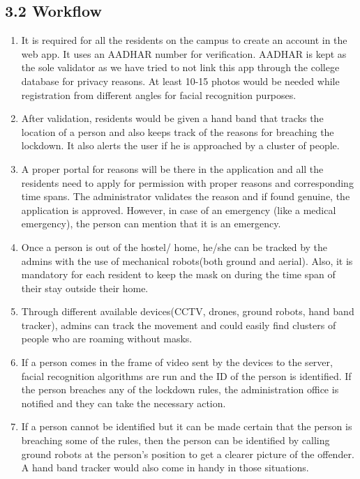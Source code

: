 \documentclass[eng]{FCEFyN-class}
\begin{document}
\subsection{3.2 Workflow}
\begin{enumerate}
\item  It is required for all the residents on the campus to create an account in the web app. It uses an AADHAR number for verification. AADHAR is kept as the sole validator as we have tried to not link this app through the college database for privacy reasons. At least 10-15 photos would be needed while registration from different angles for facial recognition purposes. 

\item After validation, residents would be given a hand band that tracks the location of a person and also keeps track of the reasons for breaching the lockdown. It also alerts the user if he is approached by a cluster of people.

\item A proper portal for reasons will be there in the application and all the residents need to apply for permission with proper reasons and corresponding time spans. The administrator validates the reason and if found genuine, the application is approved. However, in case of an emergency (like a medical emergency), the person can mention that it is an emergency.
\item Once a person is out of the hostel/ home, he/she can be tracked by the admins with the use of mechanical robots(both ground and aerial). Also, it is mandatory for each resident to keep the mask on during the time span of their stay outside their home.
\item Through different available devices(CCTV, drones, ground robots, hand band tracker), admins can track the movement and could easily find clusters of people who are roaming without masks.

\item If a person comes in the frame of video sent by the devices to the server, facial recognition algorithms are run and the ID of the person is identified. If the person breaches any of the lockdown rules, the administration office is notified and they can take the necessary action.

\item If a person cannot be identified but it can be made certain that the person is breaching some of the rules, then the person can be identified by calling ground robots at the person's position to get a clearer picture of the offender. A hand band tracker would also come in handy in those situations.

\end{enumerate}
\end{document}
